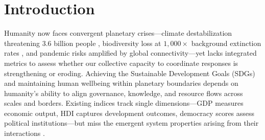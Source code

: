 \documentclass[11pt,letterpaper]{article}
\begin{document}
%
%
%
%
%

\section{Introduction}

Humanity now faces convergent planetary crises---climate destabilization threatening 3.6 billion people \citep{ipcc2022}, biodiversity loss at $1{,}000\times$ background extinction rates \citep{ceballos2015}, and pandemic risks amplified by global connectivity---yet lacks integrated metrics to assess whether our collective capacity to coordinate responses is strengthening or eroding. Achieving the Sustainable Development Goals (SDGs) and maintaining human wellbeing within planetary boundaries \citep{undp2023, scheffer2009} depends on humanity's ability to align governance, knowledge, and resource flows across scales and borders. Existing indices track single dimensions---GDP measures economic output, HDI captures development outcomes, democracy scores assess political institutions---but miss the emergent system properties arising from their interactions \citep{stiglitz2009}.
\end{document}
